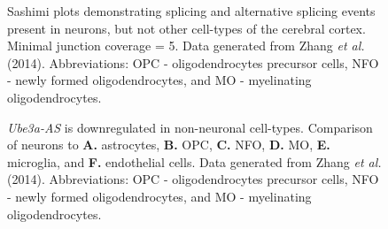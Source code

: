 \begin{figure}
  \centering
  \caption{Sashimi plots demonstrating splicing and alternative splicing events present in neurons, but not other cell-types of the cerebral cortex. Minimal junction coverage = 5. Data generated from Zhang \textit{et al.} (2014). Abbreviations: OPC - oligodendrocytes precursor cells, NFO - newly formed oligodendrocytes, and MO - myelinating oligodendrocytes.}
  \label{sashimi celltype anti}
\end{figure}
\pagebreak
\begin{figure}
  \centering
  \caption{\textit{Ube3a-AS} is downregulated in non-neuronal cell-types. Comparison of neurons to \textbf{A.} astrocytes, \textbf{B.} OPC, \textbf{C.} NFO, \textbf{D.} MO, \textbf{E.} microglia, and \textbf{F.} endothelial cells. Data generated from Zhang \textit{et al.} (2014). Abbreviations: OPC - oligodendrocytes precursor cells, NFO - newly formed oligodendrocytes, and MO - myelinating oligodendrocytes.}
  \label{logFC celltype anti}
\end{figure}
\pagebreak
